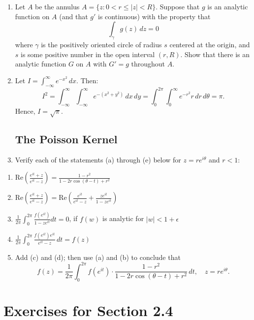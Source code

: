 \documentclass[12pt]{article}
\theoremstyle{definition} %
\theoremstyle{plain} %
\begin{document}
\begin{enumerate}
    \item Let $A$ be the annulus $A = \{ z : 0 < r \le |z| < R \}$. Suppose that $g$ is an analytic function on $A$ (and that $g'$ is continuous) with the property that
    \[
    \int_\gamma g(z) \, dz = 0
    \]
    where $\gamma$ is the positively oriented circle of radius $s$ centered at the origin, and $s$ is some positive number in the open interval $(r, R)$. Show that there is an analytic function $G$ on $A$ with $G' = g$ throughout $A$.
    
    \item Let $I = \int_{-\infty}^\infty e^{-x^2} \, dx$. Then:
    \[
    I^2 = \int_{-\infty}^\infty \int_{-\infty}^\infty e^{-(x^2 + y^2)} \, dx \, dy = \int_0^{2\pi} \int_0^\infty e^{-r^2} r \, dr \, d\theta = \pi.
    \]
    Hence, $I = \sqrt{\pi}$.
    
    \subsection*{The Poisson Kernel}
    
    \item Verify each of the statements (a) through (e) below for $z = re^{i\theta}$ and $r < 1$:
\end{enumerate}

\begin{enumerate}
    \item $\text{Re} \left( \frac{e^{it} + z}{e^{it} - z} \right) = \frac{1 - r^2}{1 - 2r \cos(\theta - t) + r^2}$
    \item $\text{Re} \left( \frac{e^{it} + z}{e^{it} - z} \right) = \text{Re} \left( \frac{e^{it}}{e^{it} - z} + \frac{z e^{it}}{1 - z e^{it}} \right)$
    \item $\frac{1}{2\pi} \int_0^{2\pi} \frac{f(e^{it})}{1 - z e^{it}} dt = 0$, if $f(w)$ is analytic for $|w| < 1 + \epsilon$
    \item $\frac{1}{2\pi} \int_0^{2\pi} \frac{f(e^{it}) e^{it}}{e^{it} - z} \, dt = f(z)$
    \item Add (c) and (d); then use (a) and (b) to conclude that
    \[
    f(z) = \frac{1}{2\pi} \int_0^{2\pi} f(e^{it}) \cdot \frac{1 - r^2}{1 - 2r \cos(\theta - t) + r^2} \, dt, \quad z = re^{i\theta}.
    \]
\end{enumerate}
\section*{Exercises for Section 2.4}
\end{document}
